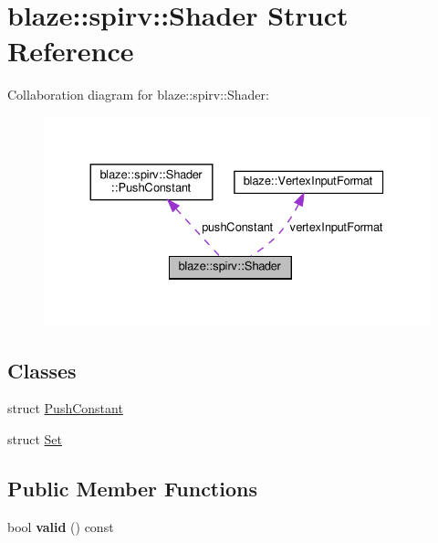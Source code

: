 \hypertarget{structblaze_1_1spirv_1_1Shader}{}\section{blaze\+:\+:spirv\+:\+:Shader Struct Reference}
\label{structblaze_1_1spirv_1_1Shader}


Collaboration diagram for blaze\+:\+:spirv\+:\+:Shader\+:\nopagebreak
\begin{figure}[H]
\begin{center}
\leavevmode
\includegraphics[width=330pt]{structblaze_1_1spirv_1_1Shader__coll__graph}
\end{center}
\end{figure}
\subsection*{Classes}
\begin{DoxyCompactItemize}
\item 
struct \hyperlink{structblaze_1_1spirv_1_1Shader_1_1PushConstant}{Push\+Constant}
\item 
struct \hyperlink{structblaze_1_1spirv_1_1Shader_1_1Set}{Set}
\end{DoxyCompactItemize}
\subsection*{Public Member Functions}
\begin{DoxyCompactItemize}
\item 
\mbox{\label{structblaze_1_1spirv_1_1Shader_a2d981cbb6738aefad91e9badb730cd1e}} 
bool {\bfseries valid} () const
\end{DoxyCompactItemize}
